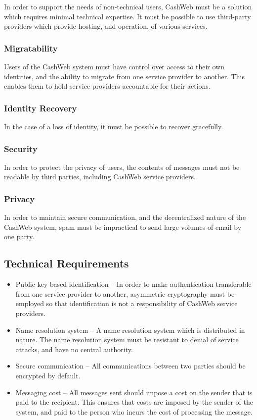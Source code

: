\documentclass{article}
\theoremstyle{definition}
\begin{document}
In order to support the needs of non-technical users, CashWeb must be a solution which requires minimal technical expertise. It must be possible to use third-party providers which provide hosting, and operation, of various services.

\subsubsection{Migratability}

Users of the CashWeb system must have control over access to their own identities, and the ability to migrate from one service provider to another. This enables them to hold service providers accountable for their actions.

\subsubsection{Identity Recovery}

In the case of a loss of identity, it must be possible to recover gracefully.

\subsubsection{Security}

In order to protect the privacy of users, the contents of messages must not be readable by third parties, including CashWeb service providers.

\subsubsection{Privacy}

In order to maintain secure communication, and the decentralized nature of the CashWeb system, spam must be impractical to send large volumes of email by one party.

\subsection{Technical Requirements}


\begin{itemize}
\item Public key based identification -- In order to make authentication transferable from one service provider to another, asymmetric cryptography must be employed so that identification is not a responsibility of CashWeb service providers.
\item Name resolution system -- A name resolution system which is distributed in nature. The name resolution system must be resistant to denial of service attacks, and have no central authority.
\item Secure communication -- All communications between two parties should be encrypted by default.
\item Messaging cost -- All messages sent should impose a cost on the sender that is paid to the recipient. This ensures that costs are imposed by the sender of the system, and paid to the person who incurs the cost of processing the message.
\end{itemize}
\end{document}
